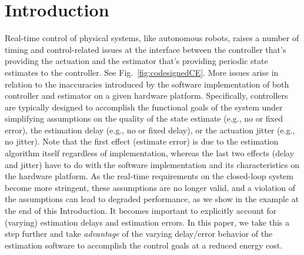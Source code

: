 \section{Introduction}
\label{introduction}

Real-time control of physical systems, like autonomous robots, raises a number of timing and control-related issues at the interface between the controller that's providing the actuation and the estimator that's providing periodic state estimates to the controller.
See Fig.~\ref{fig:codesignedCE}.
More issues arise in relation to the inaccuracies introduced by the software implementation of both controller and estimator on a given hardware platform.
Specifically, controllers are typically designed to accomplish the functional goals of the system under simplifying assumptions on the quality of the state estimate (e.g., no or fixed error), the estimation delay (e.g., no or fixed delay), or the actuation jitter (e.g., no jitter).
Note that the first effect (estimate error) is due to the estimation algorithm itself regardless of implementation, whereas the last two effects (delay and jitter) have to do with the software implementation and its characteristics on the hardware platform.
As the real-time requirements on the closed-loop system become more stringent, these assumptions are no longer valid, and a violation of the assumptions can lead to degraded performance, as we show in the example at the end of this Introduction.
It becomes important to explicitly account for (varying) estimation delays and estimation errors. 
In this paper, we take this a step further and take \emph{advantage} of the varying delay/error behavior of the estimation software to accomplish the control goals at a reduced energy cost.


